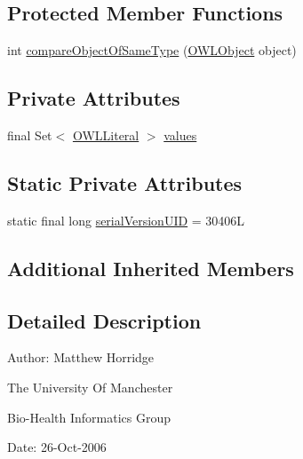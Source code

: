 \subsection*{Protected Member Functions}
\begin{DoxyCompactItemize}
\item 
int \hyperlink{classuk_1_1ac_1_1manchester_1_1cs_1_1owl_1_1owlapi_1_1_o_w_l_data_one_of_impl_aa08861f5436f710c142fc54ae055d493}{compare\-Object\-Of\-Same\-Type} (\hyperlink{interfaceorg_1_1semanticweb_1_1owlapi_1_1model_1_1_o_w_l_object}{O\-W\-L\-Object} object)
\end{DoxyCompactItemize}
\subsection*{Private Attributes}
\begin{DoxyCompactItemize}
\item 
final Set$<$ \hyperlink{interfaceorg_1_1semanticweb_1_1owlapi_1_1model_1_1_o_w_l_literal}{O\-W\-L\-Literal} $>$ \hyperlink{classuk_1_1ac_1_1manchester_1_1cs_1_1owl_1_1owlapi_1_1_o_w_l_data_one_of_impl_aba953817f70e2a98b28ab82ead8ea5db}{values}
\end{DoxyCompactItemize}
\subsection*{Static Private Attributes}
\begin{DoxyCompactItemize}
\item 
static final long \hyperlink{classuk_1_1ac_1_1manchester_1_1cs_1_1owl_1_1owlapi_1_1_o_w_l_data_one_of_impl_ae590c946c0ac5da3ebc72560e73ea667}{serial\-Version\-U\-I\-D} = 30406\-L
\end{DoxyCompactItemize}
\subsection*{Additional Inherited Members}


\subsection{Detailed Description}
Author\-: Matthew Horridge\par
 The University Of Manchester\par
 Bio-\/\-Health Informatics Group\par
 Date\-: 26-\/\-Oct-\/2006\par
\par
 

